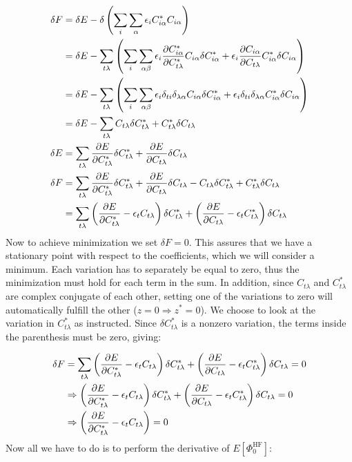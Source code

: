\documentclass{article}
\newcommand{\hafo}[1]{#1^{\text{HF}}}
\begin{document}
    \begin{align*}
        \delta F &= \delta E - \delta \left( \sum_i \sum_\alpha \epsilon_i C^*_{i\alpha}C_{i\alpha}\right)\\
        &= \delta E - \sum_{t\lambda}\left( \sum_i \sum_{\alpha\beta} \epsilon_i \pdv{C^*_{i\alpha}}{C^*_{t\lambda}}  C_{i\alpha}\delta C^*_{i\alpha} + \epsilon_i \pdv{C_{i\alpha}}{C_{t\lambda}}  C^*_{i\alpha}\delta C_{i\alpha} \right) \\
        &= \delta E - \sum_{t\lambda}\left( \sum_i \sum_{\alpha\beta} \epsilon_i \delta_{ti}\delta_{\lambda\alpha}  C_{i\alpha}\delta C^*_{i\alpha} + \epsilon_i \delta_{ti}\delta_{\lambda\alpha}  C^*_{i\alpha}\delta C_{i\alpha} \right) \\
        &= \delta E - \sum_{t\lambda} C_{t\lambda} \delta C^*_{t\lambda} + C^*_{t\lambda} \delta C_{t\lambda} \\
        \delta E &= \sum_{t\lambda} \pdv{E}{C^*_{t\lambda}} \delta C^*_{t\lambda} + \pdv{E}{C_{t\lambda}} \delta C_{t\lambda} \\
        \delta F &= \sum_{t\lambda} \pdv{E}{C^*_{t\lambda}} \delta C^*_{t\lambda} + \pdv{E}{C_{t\lambda}} \delta C_{t\lambda} - C_{t\lambda} \delta C^*_{t\lambda} + C^*_{t\lambda} \delta C_{t\lambda} \\
        &= \sum_{t\lambda} \left( \pdv{E}{C^*_{t\lambda}} - \epsilon_t C_{t\lambda} \right)\delta C^*_{t\lambda} + \left( \pdv{E}{C_{t\lambda}} - \epsilon_t C^*_{t\lambda} \right)\delta C_{t\lambda} 
    \end{align*}
    Now to achieve minimization we set $\delta F = 0$. This assures that we have a stationary point with respect to the coefficients, which we will consider a minimum. Each variation has to separately be equal to zero, thus the minimization must hold for each term in the sum. In addition, since $C_{t\lambda}$ and $C^*_{t\lambda}$ are complex conjugate of each other, setting one of the variations to zero will automatically fulfill the other ($z = 0 \Rightarrow z^* = 0$). We choose to look at the variation in $C^*_{t\lambda}$ as instructed. Since $\delta C^*_{t\lambda}$ is a nonzero variation, the terms inside the parenthesis must be zero, giving:      
    
    \begin{align}
        \delta F &= \sum_{t \lambda} \left( \pdv{E}{C^*_{t\lambda}} - \epsilon_t C_{t\lambda} \right)\delta C^*_{t\lambda} + \left( \pdv{E}{C_{t\lambda}} - \epsilon_t C^*_{t\lambda} \right)\delta C_{t\lambda} = 0 \nonumber\\
        &\Rightarrow \left( \pdv{E}{C^*_{t\lambda}} - \epsilon_t C_{t\lambda} \right)\delta C^*_{t\lambda} + \left( \pdv{E}{C_{t\lambda}} - \epsilon_t C^*_{t\lambda} \right)\delta C_{t\lambda} = 0 \nonumber\\
        &\Rightarrow \left( \pdv{E}{C^*_{t\lambda}} - \epsilon_t C_{t\lambda} \right) = 0 \label{eq:HF_optimizer}
    \end{align}
    Now all we have to do is to perform the derivative of $E[\hafo{\Phi_0}]$:
\end{document}
